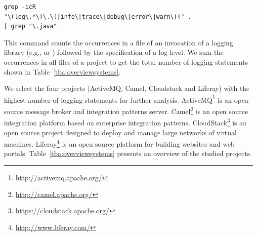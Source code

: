 \vspace{-5mm}
\begin{Code}
\begin{lstlisting}[caption={Counting logging statements}, label={lst:grep}]
grep -icR 
"\(log\.*\)\.\(|info\|trace\|debug\|error\|warn\)(" . 
| grep "\.java"
\end{lstlisting}
\end{Code}
\vspace{-5mm}

This command counts the occurrences in a file of an invocation of a logging library (e.g.,  or ) followed by the specification of a log level. We sum the occurrences in all files of a project to get the total number of logging statements shown in Table~\ref{tba:overviewsystems}.
 
We select the four projects (ActiveMQ, Camel, Cloudstack and Liferay) with the highest number of logging statements for further analysis. ActiveMQ\footnote{\url{http://activemq.apache.org/}} is an open source message broker and integration patterns server. Camel\footnote{\url{http://camel.apache.org/}} is an open source integration platform based on enterprise integration patterns. CloudStack\footnote{\url{https://cloudstack.apache.org/}} is an open source project designed to deploy and manage large networks of virtual machines. Liferay\footnote{\url{http://www.liferay.com/}} is an open source platform for building websites and web portals. Table~\ref{tba:overviewsystems} presents an overview of the studied projects. %



